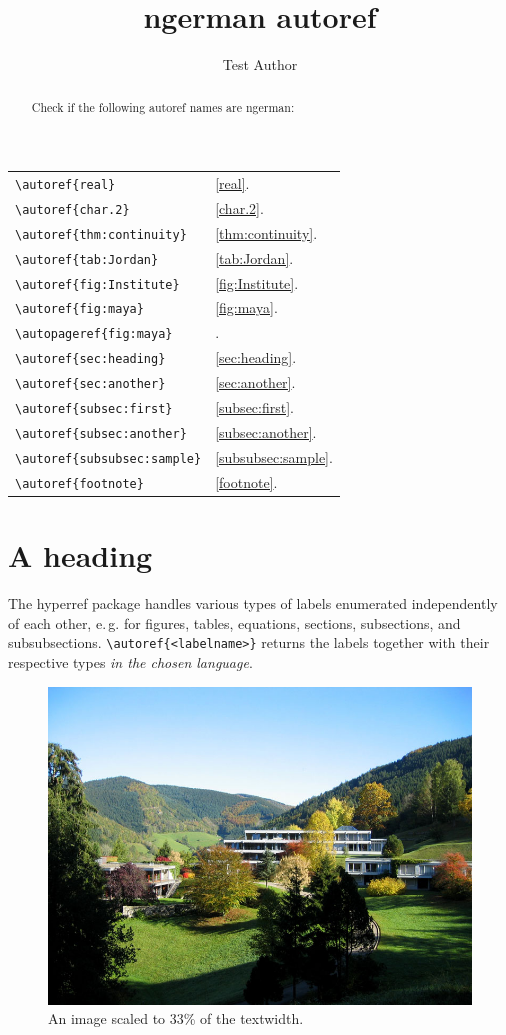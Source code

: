 \documentclass{snapshotmfo}
\author{Test Author}
\title{ngerman autoref}
\begin{document}
	\begin{abstract}
		Check if the following autoref names are ngerman:
	\end{abstract}
	
	\noindent\begin{tabular}{@{}l@{\quad yields\quad}l@{}}
		\verb+\autoref{real}+             &\autoref{real}.\\
		\verb+\autoref{char.2}+           &\autoref{char.2}.\\
		\verb+\autoref{thm:continuity}+   &\autoref{thm:continuity}.\\
		\verb+\autoref{tab:Jordan}+       &\autoref{tab:Jordan}.\\
		\verb+\autoref{fig:Institute}+    &\autoref{fig:Institute}.\\
		\verb+\autoref{fig:maya}+         &\autoref{fig:maya}.\\
		\verb+\autopageref{fig:maya}+     &\autopageref{fig:maya}.\\
		\verb+\autoref{sec:heading}+      &\autoref{sec:heading}.\\
		\verb+\autoref{sec:another}+      &\autoref{sec:another}.\\
		\verb+\autoref{subsec:first}+     &\autoref{subsec:first}.\\
		\verb+\autoref{subsec:another}+   &\autoref{subsec:another}.\\
		\verb+\autoref{subsubsec:sample}+ &\autoref{subsubsec:sample}.\\
		\verb+\autoref{footnote}+         &\autoref{footnote}.\\
	\end{tabular}
	
	
	\section{A heading}
	\label{sec:heading}
	The hyperref package handles various types of labels enumerated independently of each other, e.\,g.
	for figures, tables, equations, sections, subsections, and subsubsections.
	\verb+\autoref{<labelname>}+ returns the labels together with their respective types {\em in the chosen language}.
	
	\begin{figure}[ht]
		\centering 
		\includegraphics[width= 0.33 \textwidth]{mfo.jpg}
		\caption{An image scaled to 33\% of the textwidth.}
		\label{fig:Institute}
	\end{figure}
	
\end{document}
